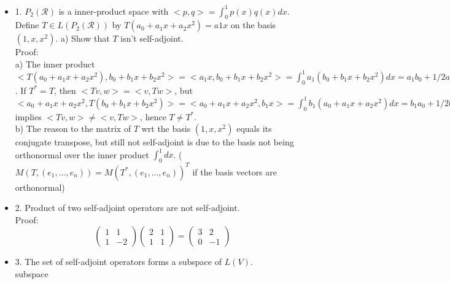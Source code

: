\documentclass[12pt]{article}
\begin{document}
\begin{itemize}   

\item 1. $P_2(\mathcal{R})$ is a inner-product space with $<p,q>= \int_0^1 p(x)q(x)dx$. Define $T \in L(P_2(\mathcal{R}))$ by $T(a_0+a_1x+a_2x^2)=a1x$ on the basis $(1,x,x^2)$.
a) Show that $T$ isn't self-adjoint. \\
Proof: \\
a) The inner product 
$<T(a_0+a_1x+a_2x^2),b_0+b_1x+b_2x^2> = <a_1x,b_0+b_1x+b_2x^2>= \int_0^1a_1(b_0+b_1x+b_2x^2)dx= a_1b_0+1/2a_1b_1+1/3a_1b_2$.
If $T^*=T$, then $<Tv,w>= <v,Tw>$, but
$<a_0+a_1x+a_2x^2,T(b_0+b_1x+b_2x^2)> = <a_0+a_1x+a_2x^2,b_1x>= \int_0^1b_1(a_0+a_1x+a_2x^2)dx= b_1a_0+1/2b_1a_1+1/3b_1a_2$ implies $<Tv,w> \neq <v,Tw>$, hence $T\neq T^*$. \\

b) The reason to the matrix of $T$ wrt the basis $(1,x,x^2)$ equals its conjugate transpose, but still not self-adjoint is due to the basis not being orthonormal over the inner product $\int_0^1 dx$.  ($M(T,(e_1,\dotsc,e_n)) = M(T^*,(e_1,\dotsc,e_n))^T$ if the basis vectors are orthonormal) \\


\item 2. Product of two self-adjoint operators are not self-adjoint. \\
Proof: \\
\begin{equation}
\begin{pmatrix}
   1 & 1 \\
   1 & -2
\end{pmatrix}
\begin{pmatrix}
   2 & 1 \\
   1 & 1 
\end{pmatrix}
=
\begin{pmatrix}
   3 & 2 \\
   0 & -1
\end{pmatrix}
\end{equation}

\item 3. The set of self-adjoint operators forms a subspace of $L(V)$. \\
subspace












\end{itemize}
\end{document}
